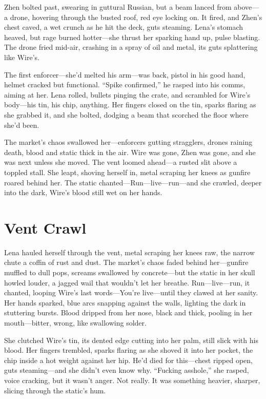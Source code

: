 \documentclass[12pt]{book}
\begin{document}
Zhen bolted past, swearing in guttural Russian, but a beam lanced from above---a drone, hovering through the busted roof, red eye locking on. It fired, and Zhen’s chest caved, a wet crunch as he hit the deck, guts steaming. Lena’s stomach heaved, but rage burned hotter---she thrust her sparking hand up, pulse blasting. The drone fried mid-air, crashing in a spray of oil and metal, its guts splattering like Wire’s.

The first enforcer---she’d melted his arm---was back, pistol in his good hand, helmet cracked but functional. ``Spike confirmed,'' he rasped into his comms, aiming at her. Lena rolled, bullets pinging the crate, and scrambled for Wire’s body---his tin, his chip, anything. Her fingers closed on the tin, sparks flaring as she grabbed it, and she bolted, dodging a beam that scorched the floor where she’d been.

The market’s chaos swallowed her---enforcers gutting stragglers, drones raining death, blood and static thick in the air. Wire was gone, Zhen was gone, and she was next unless she moved. The vent loomed ahead---a rusted slit above a toppled stall. She leapt, shoving herself in, metal scraping her knees as gunfire roared behind her. The static chanted---Run---live---run---and she crawled, deeper into the dark, Wire’s blood still wet on her hands.

\section{Vent Crawl}

Lena hauled herself through the vent, metal scraping her knees raw, the narrow chute a coffin of rust and dust. The market’s chaos faded behind her—gunfire muffled to dull pops, screams swallowed by concrete—but the static in her skull howled louder, a jagged wail that wouldn’t let her breathe. Run—live—run, it chanted, looping Wire’s last words—You’re live—until they clawed at her sanity. Her hands sparked, blue arcs snapping against the walls, lighting the dark in stuttering bursts. Blood dripped from her nose, black and thick, pooling in her mouth—bitter, wrong, like swallowing solder.

She clutched Wire’s tin, its dented edge cutting into her palm, still slick with his blood. Her fingers trembled, sparks flaring as she shoved it into her pocket, the chip inside a hot weight against her hip. He’d died for this—chest ripped open, guts steaming—and she didn’t even know why. “Fucking asshole,” she rasped, voice cracking, but it wasn’t anger. Not really. It was something heavier, sharper, slicing through the static’s hum.
\end{document}
